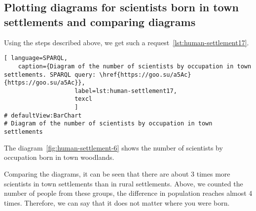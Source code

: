 \subsection{Plotting diagrams for scientists born in town settlements and comparing diagrams}

Using the steps described above, we get such a request~\ref{lst:human-settlement17}.


\begin{lstlisting}[ language=SPARQL, 
    caption={Diagram of the number of scientists by occupation in town settlements. SPARQL query: \href{https://goo.su/a5Ac}{https://goo.su/a5Ac}},
                    label=lst:human-settlement17,
                    texcl 
                    ]
# defaultView:BarChart
# Diagram of the number of scientists by occupation in town settlements

\end{lstlisting}%

The diagram~\ref{fig:human-settlement-6} shows the number of scientists by occupation born in town woodlands.

\begin{figure*}
    \setlength{\fboxsep}{0pt}%
    \setlength{\fboxrule}{1pt}%
	\label{fig:human-settlement-6}
	\caption[Diagram of the number of scientists by occupation in town settlements.]{Diagram of the number of scientists by occupation in town settlements. SPARQL query: \href{https://goo.su/a5Ac}{https://goo.su/a5Ac}}%
\end{figure*} 

Comparing the diagrams, it can be seen that there are about 3 times more scientists in town settlements than in rural settlements. Above, we counted the number of people from these groups, the difference in population reaches almost 4 times. Therefore, we can say that it does not matter where you were born.
